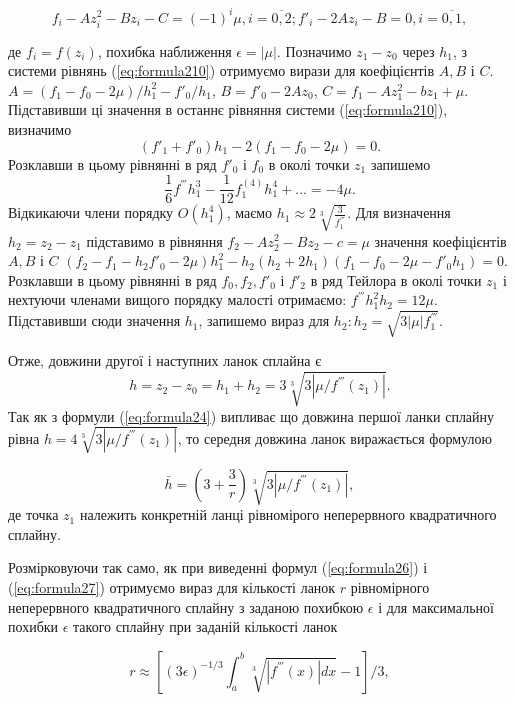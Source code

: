 \documentclass[ukrainian,14pt]{extarticle}
\begin{document}
\begin{equation}\label{eq:formula210}
    f_i - Az^2_i - Bz_i - C = (-1)^i \mu, i = \overline{0,2}; f'_i - 2Az_i - B = 0, i = \overline{0, 1},
\end{equation}

де $f_i = f(z_i)$, похибка наближення $\epsilon = |\mu|$. Позначимо $z_1 - z_0$ через $h_1$, з системи рівнянь (\ref{eq:formula210}) отримуємо вирази для коефіцієнтів $A, B$ і $C$. $A = (f_1 - f_0 - 2\mu) / h_1^2 - f'_0 / h_1$, $B=f'_0 - 2Az_0$, $C = f_1 - Az_1^2 - bz_1 + \mu$. Підставивши ці значення в останнє рівняння системи (\ref{eq:formula210}), визначимо
$$(f'_1 + f'_0) h_1 - 2(f_1 - f_0 -2\mu) = 0.$$
Розклавши в цьому рівнянні в ряд $f'_0$ і $f_0$ в околі точки $z_1$ запишемо
$$\frac{1}{6}f^{'''}h^3_1 - \frac{1}{12} f_1^{(4)}h_1^4 + \ldots = -4\mu.$$
Відкикаючи члени порядку $O(h_1^4)$, маємо $h_1 \approx 2 \sqrt[3]{\frac{3}{f^{'''}_1}}$. Для визначення $h_2 = z_2 - z_1$ підставимо в рівняння $f_2 - Az_2^2 - Bz_2 - c = \mu$ значення коефіцієнтів $A, B$ і $C$
$(f_2 - f_1 - h_2 f'_0 - 2\mu) h_1^2 - h_2(h_2 + 2h_1)(f_1 - f_0 - 2\mu - f'_0h_1) = 0.$
Розклавши в цьому рівнянні в ряд $f_0, f_2, f'_0$ і $f'_2$ в ряд Тейлора в околі точки $z_1$ і нехтуючи членами вищого порядку малості отримаємо: $f^{'''}h^2_1 h_2 = 12\mu$. Підставивши сюди значення $h_1$, запишемо вираз для $h_2: h_2 = \sqrt{3 |\mu| f^{'''}_1}$.

Отже, довжини другої і наступних ланок сплайна є
$$h = z_2 - z_0 = h_1 + h_2 = 3 \sqrt[3]{3 |\mu / f^{'''}(z_1)|}.$$ Так як з формули (\ref{eq:formula24}) випливає що довжина першої ланки сплайну рівна $h = 4\sqrt[3]{3 |\mu / f^{'''}(z_1)|}$, то середня довжина ланок виражається формулою

\begin{equation}\label{eq:formula211}
    \bar{h} = \left(3 + \frac{3}{r}\right) \sqrt[3]{3 |\mu / f^{'''}(z_1)|}, 
\end{equation}
де точка $z_1$ належить конкретній ланці рівномірого неперервного квадратичного сплайну.

Розмірковуючи так само, як при виведенні формул (\ref{eq:formula26}) і (\ref{eq:formula27}) отримуємо вираз для кількості ланок $r$ рівномірного неперервного квадратичного сплайну з заданою похибкою $\epsilon$ і для максимальної похибки $\epsilon$ такого сплайну при заданій кількості ланок

\begin{equation}\label{eq:formula212}
    r \approx \left[  (3\epsilon)^{-1/3} \int_a^b \sqrt[3]{|f^{'''}(x)| dx} - 1   \right] / 3 ,
\end{equation}
\end{document}
